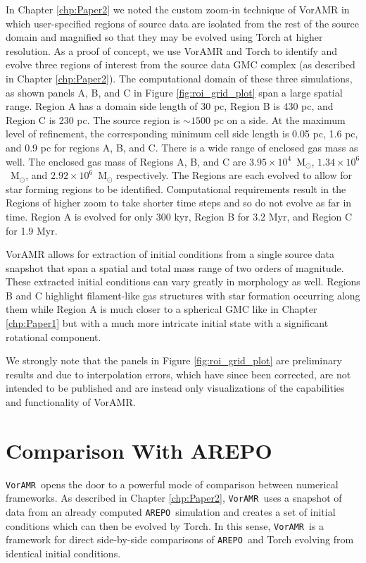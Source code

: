 \documentclass[twoside]{drexel-thesis}
\newcommand\voramr{\texttt{VorAMR}}
\newcommand\arepo{\texttt{AREPO}}
\begin{document}
\begin{thesis}
\begin{figure}
\end{figure}
In Chapter \ref{chp:Paper2} we noted the custom zoom-in technique of VorAMR in which user-specified regions of source data are isolated from the rest of the source domain and magnified so that they may be evolved using Torch at higher resolution. As a proof of concept, we use VorAMR and Torch to identify and evolve three regions of interest from the source data GMC complex (as described in Chapter \ref{chp:Paper2}). The computational domain of these three simulations, as shown panels A, B, and C in Figure \ref{fig:roi_grid_plot} span a large spatial range. Region A has a domain side length of 30 pc, Region B is 430 pc, and Region C is 230 pc. The source region is $\sim1500$ pc on a side. At the maximum level of refinement, the corresponding minimum cell side length is 0.05 pc, 1.6 pc, and 0.9 pc for regions A, B, and C. There is a wide range of enclosed gas mass as well. The enclosed gas mass of Regions A, B, and C are $3.95\times10^4$~M$_\odot$, $1.34\times10^6$~M$_\odot$, and $2.92\times10^6$~M$_\odot$ respectively. The Regions are each evolved to allow for star forming regions to be identified. Computational requirements result in the Regions of higher zoom to take shorter time steps and so do not evolve as far in time. Region A is evolved for only 300 kyr, Region B for 3.2 Myr, and Region C for 1.9 Myr.

VorAMR allows for extraction of initial conditions from a single source data snapshot that span a spatial and total mass range of two orders of magnitude. These extracted initial conditions can vary greatly in morphology as well. Regions B and C highlight filament-like gas structures with star formation occurring along them while Region A is much closer to a spherical GMC like in Chapter \ref{chp:Paper1} but with a much more intricate initial state with a significant rotational component.

We strongly note that the panels in Figure \ref{fig:roi_grid_plot} are preliminary results and due to interpolation errors, which have since been corrected, are not intended to be published and are instead only visualizations of the capabilities and functionality of VorAMR.

\section{Comparison With AREPO}
\voramr~opens the door to a powerful mode of comparison between numerical frameworks. As described in Chapter \ref{chp:Paper2}, \voramr~uses a snapshot of data from an already computed \arepo~simulation and creates a set of initial conditions which can then be evolved by Torch. In this sense, \voramr~is a framework for direct side-by-side comparisons of \arepo~and Torch evolving from identical initial conditions.


\end{thesis}
\end{document}
